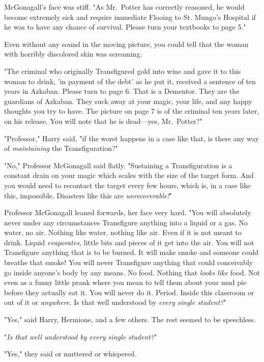 McGonagall's face was stiff. "As Mr.~Potter has correctly reasoned, he would 
become extremely sick and require immediate Flooing to St. Mungo's Hospital if 
he was to have any chance of survival. Please turn your textbooks to page 5."

Even without any sound in the moving picture, you could tell that the woman 
with horribly discolored skin was screaming.

"The criminal who originally Transfigured gold into wine and gave it to this 
woman to drink, 'in payment of the debt' as he put it, received a sentence of 
ten years in Azkaban. Please turn to page 6. That is a Dementor. They are the 
guardians of Azkaban. They suck away at your magic, your life, and any happy 
thoughts you try to have. The picture on page 7 is of the criminal ten years 
later, on his release. You will note that he is dead---yes, Mr.~Potter?"

"Professor," Harry said, "if the worst happens in a case like that, is there 
any way of \emph{maintaining} the Transfiguration?"

"No," Professor McGonagall said flatly. "Sustaining a Transfiguration is a 
constant drain on your magic which scales with the size of the target form. And 
you would need to recontact the target every few hours, which is, in a case 
like this, impossible. Disasters like this are \emph{unrecoverable!}"

Professor McGonagall leaned forwards, her face very hard. "You will absolutely 
never under any circumstances Transfigure anything into a liquid or a gas. No 
water, no air. Nothing like water, nothing like air. Even if it is not meant to 
drink. Liquid \emph{evaporates,} little bits and pieces of it get into the air. 
You will not Transfigure anything that is to be burned. It will make smoke and 
someone could breathe that smoke! You will never Transfigure anything that 
could conceivably go inside anyone's body by any means. No food. Nothing that 
\emph{looks like} food. Not even as a funny little prank where you mean to tell 
them about your mud pie before they actually eat it. You will never do it. 
Period. Inside this classroom or out of it or \emph{anywhere.} Is that well 
understood by \emph{every single student?}"

"Yes," said Harry, Hermione, and a few others. The rest seemed to be speechless.

"\emph{Is that well understood by every single student?}"

"Yes," they said or muttered or whispered.


